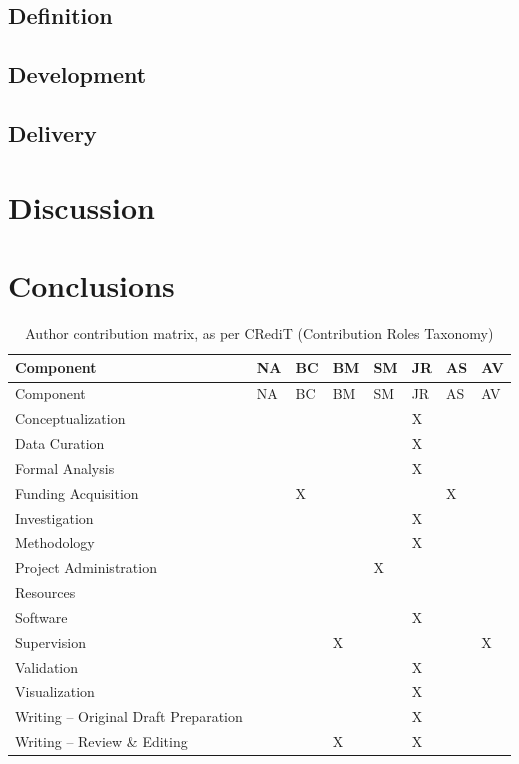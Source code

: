 \documentclass[preprint, 3p,
authoryear]{elsarticle} %
\begin{document}
\subsection{Definition}\label{definition}

\subsection{Development}\label{development}

\subsection{Delivery}\label{delivery}

\section{Discussion}\label{discussion}

\section{Conclusions}\label{conclusions}

\begin{longtable}[]{@{}llllllll@{}}
\caption{Author contribution matrix, as per CRediT (Contribution Roles
Taxonomy)}\tabularnewline
\toprule\noalign{}
Component & NA & BC & BM & SM & JR & AS & AV \\
\midrule\noalign{}
\endfirsthead
\toprule\noalign{}
Component & NA & BC & BM & SM & JR & AS & AV \\
\midrule\noalign{}
\endhead
\bottomrule\noalign{}
\endlastfoot
Conceptualization & & & & & X & & \\
Data Curation & & & & & X & & \\
Formal Analysis & & & & & X & & \\
Funding Acquisition & & X & & & & X & \\
Investigation & & & & & X & & \\
Methodology & & & & & X & & \\
Project Administration & & & & X & & & \\
Resources & & & & & & & \\
Software & & & & & X & & \\
Supervision & & & X & & & & X \\
Validation & & & & & X & & \\
Visualization & & & & & X & & \\
Writing -- Original Draft Preparation & & & & & X & & \\
Writing -- Review \& Editing & & & X & & X & & \\
\end{longtable}

\renewcommand\refname{References}

\end{document}
